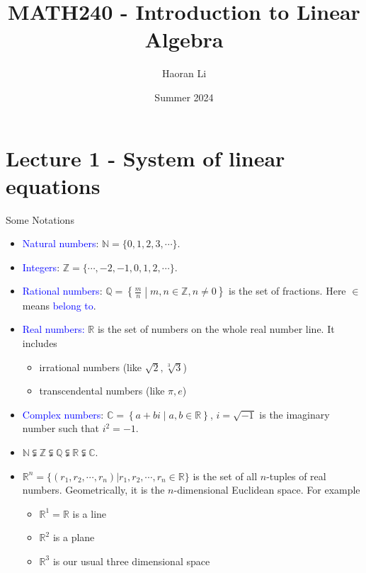 \documentclass{beamer}
\title{MATH240 - Introduction to Linear Algebra}
\author{Haoran Li}
\institute[UMD]{University of Maryland, College Park}
\date{Summer 2024}
\theoremstyle{definition}
\theoremstyle{remark}
\begin{document}
\maketitle

\section{Lecture 1 - System of linear equations}


\begin{frame}{Some Notations}\pause
\begin{itemize}
\item \textcolor{blue}{Natural numbers}: $\mathbb N=\{0,1,2,3,\cdots\}$.
\pause
\item \textcolor{blue}{Integers}: $\mathbb Z=\{\cdots,-2,-1,0,1,2,\cdots\}$.
\pause
\item \textcolor{blue}{Rational numbers}: $\mathbb Q=\left\{\frac{m}{n}\middle|m,n\in\mathbb Z,n\neq0\right\}$ is the set of fractions. Here $\in$ means \textcolor{blue}{belong to}.
\pause
\item \textcolor{blue}{Real numbers:} $\mathbb R$ is the set of numbers on the whole real number line. \pause It includes
\begin{itemize}
\item irrational numbers (like $\sqrt{2},\sqrt[3]{3}$) 
\item transcendental numbers (like $\pi,e$)
\end{itemize}
\pause
\item \textcolor{blue}{Complex numbers}: $\mathbb C=\left\{a+bi\middle|a,b\in\mathbb R\right\}$, $i=\sqrt{-1}$ is the imaginary number such that $i^2=-1$.
\pause
\item $\mathbb N\subsetneqq\mathbb Z\subsetneqq\mathbb Q\subsetneqq\mathbb R\subsetneqq\mathbb C$.
\pause
\item $\mathbb R^n=\{(r_1,r_2,\cdots,r_n)|r_1,r_2,\cdots,r_n\in\mathbb R\}$ is the set of all $n$-tuples of real numbers. \pause Geometrically, it is the $n$-dimensional Euclidean space. For example
\begin{itemize}
\item $\mathbb R^1=\mathbb R$ is a line
\item $\mathbb R^2$ is a plane
\item $\mathbb R^3$ is our usual three dimensional space
\end{itemize}
\end{itemize}
\end{frame}
\end{document}
